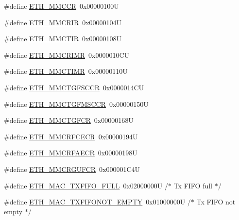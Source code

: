 \begin{DoxyCompactItemize}
\item 
\#define \hyperlink{group___h_a_l___e_t_h___aliased___defines_ga340605767fdf406c393f046be44a1e09}{E\+T\+H\+\_\+\+M\+M\+C\+CR}~0x00000100U
\item 
\#define \hyperlink{group___h_a_l___e_t_h___aliased___defines_gaa49af339607e5c30c69d55f4941fd775}{E\+T\+H\+\_\+\+M\+M\+C\+R\+IR}~0x00000104U
\item 
\#define \hyperlink{group___h_a_l___e_t_h___aliased___defines_gab53a2a3649b1b96533c3bb8f2dfca221}{E\+T\+H\+\_\+\+M\+M\+C\+T\+IR}~0x00000108U
\item 
\#define \hyperlink{group___h_a_l___e_t_h___aliased___defines_ga42e63a205698925c20f69be3d711ae59}{E\+T\+H\+\_\+\+M\+M\+C\+R\+I\+MR}~0x0000010\+CU
\item 
\#define \hyperlink{group___h_a_l___e_t_h___aliased___defines_gad0e2ddcc50c96772130c9717aa1ec496}{E\+T\+H\+\_\+\+M\+M\+C\+T\+I\+MR}~0x00000110U
\item 
\#define \hyperlink{group___h_a_l___e_t_h___aliased___defines_ga355a8ef08cc4a431601016a076ae9562}{E\+T\+H\+\_\+\+M\+M\+C\+T\+G\+F\+S\+C\+CR}~0x0000014\+CU
\item 
\#define \hyperlink{group___h_a_l___e_t_h___aliased___defines_gad2324378454cb5afc2709afc6849067d}{E\+T\+H\+\_\+\+M\+M\+C\+T\+G\+F\+M\+S\+C\+CR}~0x00000150U
\item 
\#define \hyperlink{group___h_a_l___e_t_h___aliased___defines_ga1de87b7bf29865be1068300dd2946caf}{E\+T\+H\+\_\+\+M\+M\+C\+T\+G\+F\+CR}~0x00000168U
\item 
\#define \hyperlink{group___h_a_l___e_t_h___aliased___defines_gacb9b04ab9c5957905a2db7314d6907b8}{E\+T\+H\+\_\+\+M\+M\+C\+R\+F\+C\+E\+CR}~0x00000194U
\item 
\#define \hyperlink{group___h_a_l___e_t_h___aliased___defines_ga99f6ddc380fffdfe66e6659f7c4ba325}{E\+T\+H\+\_\+\+M\+M\+C\+R\+F\+A\+E\+CR}~0x00000198U
\item 
\#define \hyperlink{group___h_a_l___e_t_h___aliased___defines_gadd605f380a482a06a59498eea4cad15f}{E\+T\+H\+\_\+\+M\+M\+C\+R\+G\+U\+F\+CR}~0x000001\+C4U
\item 
\#define \hyperlink{group___h_a_l___e_t_h___aliased___defines_ga568f5f8aa8a6dc34f446e303adac0e6d}{E\+T\+H\+\_\+\+M\+A\+C\+\_\+\+T\+X\+F\+I\+F\+O\+\_\+\+F\+U\+LL}~0x02000000\+U  /$\ast$ Tx F\+I\+F\+O full $\ast$/
\item 
\#define \hyperlink{group___h_a_l___e_t_h___aliased___defines_ga4c428a862f392d95b5dd889e8cd96924}{E\+T\+H\+\_\+\+M\+A\+C\+\_\+\+T\+X\+F\+I\+F\+O\+N\+O\+T\+\_\+\+E\+M\+P\+TY}~0x01000000\+U  /$\ast$ Tx F\+I\+F\+O not empty $\ast$/

\end{DoxyCompactItemize}
